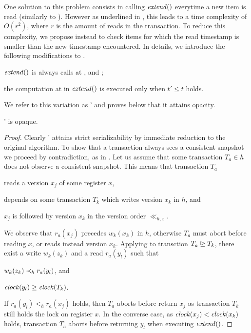 One solution to this problem consists in calling $\stmExtend{}$ everytime a new item is read (similarly to \cite{}).
However as underlined in , this leads to a time complexity of $O(r^2)$, where $r$ is the amount of reads in the transaction.
To reduce this complexity, we propose instead to check items for which the read timestamp is smaller than the new timestamp encountered.
In details, we introduce the following modifications to .
\begin{compactitem}
\item $\stmExtend{}$ is always calls at ,  and ;
\item the computation at  in $\stmExtend{}$ is executed only when $t' \leq t$ holds.
\end{compactitem}
We refer to this variation as ' and proves below that it attains opacity.

\begin{theorem}
  ' is opaque.
\end{theorem}

\begin{proof}

  Clearly ' attains strict serializability by immediate reduction to the original algorithm.
  To show that a transaction always sees a consistent snapshot we proceed by contradiction, as in .
  Let us assume that some transaction $T_a \in h$ does not observe a consistent snapshot.
  This means that transaction $T_a$
  \begin{inparaenum}
  \item reads a version $x_j$ of some register $x$,
  \item depends on some transaction $T_k$ which writes version $x_k$ in $h$, and
  \item $x_j$ is followed by version $x_k$ in the version order $\ll_{h,x}$.
  \end{inparaenum}
  We observe that $r_a(x_j)$ precedes $w_k(x_k)$ in $h$, otherwise $T_a$ must abort before reading $x$, or reads instead version $x_k$.
  Applying  to transction $T_a \mathrel{\unrhd} T_k$, there exist a write $w_k(z_k)$ and a read $r_a(y_l)$ such that
  \begin{inparaenum}
  \item $w_k(z_k) \hb_h r_a(y_l)$, and
  \item $\clockOf{y_l} \geq \clockOf{T_k}$.
  \end{inparaenum}  
  If $r_a(y_l) <_h r_a(x_j)$ holds, then $T_a$ aborts before return $x_j$ as transaction $T_k$ still holds the lock on register $x$.
  In the converse case, as $\clockOf{x_j} < \clockOf{x_k}$ holds, transaction $T_a$ aborts before returning $y_l$ when executing $\stmExtend{}$.  
    
\end{proof}

